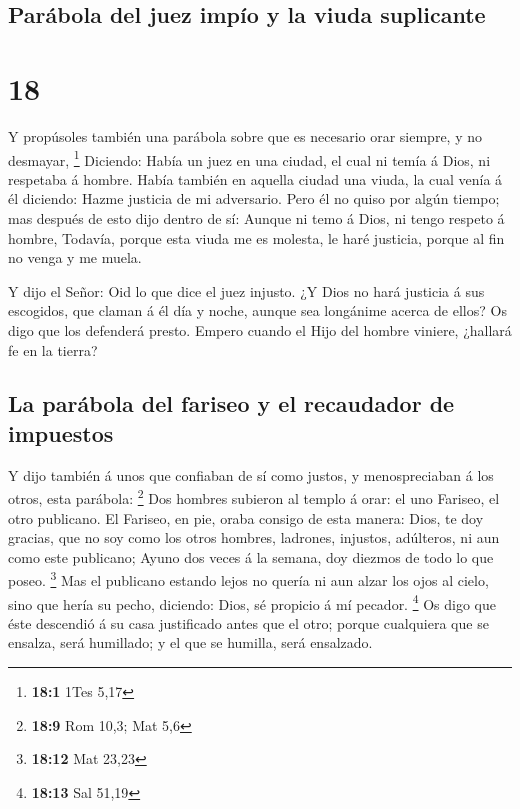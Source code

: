 \hypertarget{paruxe1bola-del-juez-impuxedo-y-la-viuda-suplicante}{%
\subsection{Parábola del juez impío y la viuda
suplicante}\label{paruxe1bola-del-juez-impuxedo-y-la-viuda-suplicante}}

\hypertarget{section-17}{%
\section{18}\label{section-17}}

 Y propúsoles también una parábola sobre que es necesario
orar siempre, y no desmayar, \footnote{\textbf{18:1} 1Tes 5,17}
 Diciendo: Había un juez en una ciudad, el cual ni temía á
Dios, ni respetaba á hombre.  Había también en aquella
ciudad una viuda, la cual venía á él diciendo: Hazme justicia de mi
adversario.  Pero él no quiso por algún tiempo; mas
después de esto dijo dentro de sí: Aunque ni temo á Dios, ni tengo
respeto á hombre,  Todavía, porque esta viuda me es
molesta, le haré justicia, porque al fin no venga y me muela.

 Y dijo el Señor: Oid lo que dice el juez injusto.
 ¿Y Dios no hará justicia á sus escogidos, que claman á él
día y noche, aunque sea longánime acerca de ellos?  Os
digo que los defenderá presto. Empero cuando el Hijo del hombre viniere,
¿hallará fe en la tierra?

\hypertarget{la-paruxe1bola-del-fariseo-y-el-recaudador-de-impuestos}{%
\subsection{La parábola del fariseo y el recaudador de
impuestos}\label{la-paruxe1bola-del-fariseo-y-el-recaudador-de-impuestos}}

 Y dijo también á unos que confiaban de sí como justos, y
menospreciaban á los otros, esta parábola: \footnote{\textbf{18:9} Rom
  10,3; Mat 5,6}  Dos hombres subieron al templo á orar:
el uno Fariseo, el otro publicano.  El Fariseo, en pie,
oraba consigo de esta manera: Dios, te doy gracias, que no soy como los
otros hombres, ladrones, injustos, adúlteros, ni aun como este
publicano;  Ayuno dos veces á la semana, doy diezmos de
todo lo que poseo. \footnote{\textbf{18:12} Mat 23,23} 
Mas el publicano estando lejos no quería ni aun alzar los ojos al cielo,
sino que hería su pecho, diciendo: Dios, sé propicio á mí pecador.
\footnote{\textbf{18:13} Sal 51,19}  Os digo que éste
descendió á su casa justificado antes que el otro; porque cualquiera que
se ensalza, será humillado; y el que se humilla, será ensalzado.

